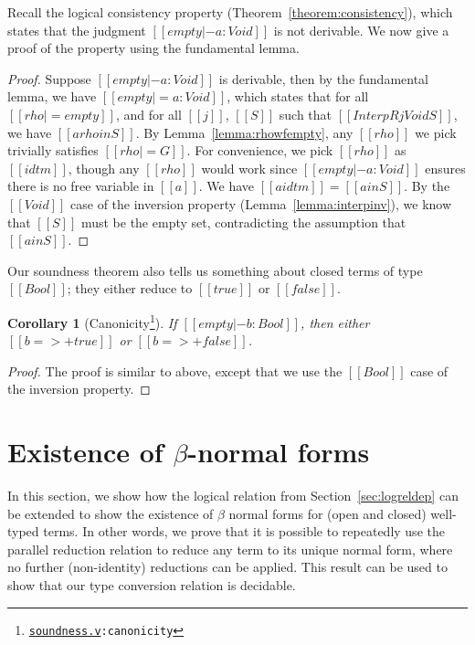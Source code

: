 \documentclass[\ifpublic nolinenum\else\fi,online,OA]{jfp}
\newcommand{\yl}[1]{}
\newcommand{\dotv}[2]{\href{#1}{\texttt{#1}}{\texttt{:#2}}}
\newtheorem{corollary}[theorem]{Corollary}
\theoremstyle{definition}
\begin{document}
Recall the logical consistency property
(Theorem~\ref{theorem:consistency}), which states that the judgment
$[[empty |- a : Void ]]$ is not derivable. We now give a proof of the
property using the fundamental lemma.

\begin{proof}
  Suppose $[[empty |- a : Void]]$ is derivable, then by the
  fundamental lemma, we have $[[empty |= a : Void]]$, which states
  that for all $[[rho |= empty]]$, and for all $[[j]]$, $[[S]]$ such
  that $[[InterpR j Void S]]$, we have $[[a {rho} in S]]$. By
  Lemma~\ref{lemma:rhowfempty}, any $[[rho]]$ we pick trivially
  satisfies $[[rho |= G]]$. For convenience, we pick $[[rho]]$ as
  $[[idtm]]$, though any $[[rho]]$ would work since
  $[[empty |- a : Void]]$ ensures there is no free variable in
  $[[a]]$. We have $[[a {idtm}]] = [[a in S]]$. By the $[[Void]]$
  case of the inversion property (Lemma~\ref{lemma:interpinv}), we
  know that $[[S]]$ must be the empty set, contradicting
  the assumption that $[[a in S]]$.
\end{proof}

Our soundness theorem also tells us something about closed terms of type 
$[[Bool]]$; they either reduce to $[[true]]$ or $[[false]]$.

\begin{corollary}[Canonicity\footnote{\dotv{soundness.v}{canonicity}}]
If $[[empty |- b : Bool]]$, then either $[[b =>+ true]]$ or $[[b =>+ false]]$.
\end{corollary}
\begin{proof}
  The proof is similar to above, except that we use the $[[Bool]]$ case of the
  inversion property.
\end{proof}

\section{Existence of \texorpdfstring{$\beta$}{beta}-normal forms}
\label{sec:extension}
In this section, we show how the logical relation from
Section~\ref{sec:logreldep} can be extended to show the existence of $\beta$
normal forms for (open and closed) well-typed terms.  In other words, we prove
that it is possible to repeatedly use the parallel reduction relation to
reduce any term to its unique normal form, where no further (non-identity)
reductions can be applied. This result can be used to show that our type
conversion relation is decidable.%
\end{document}
